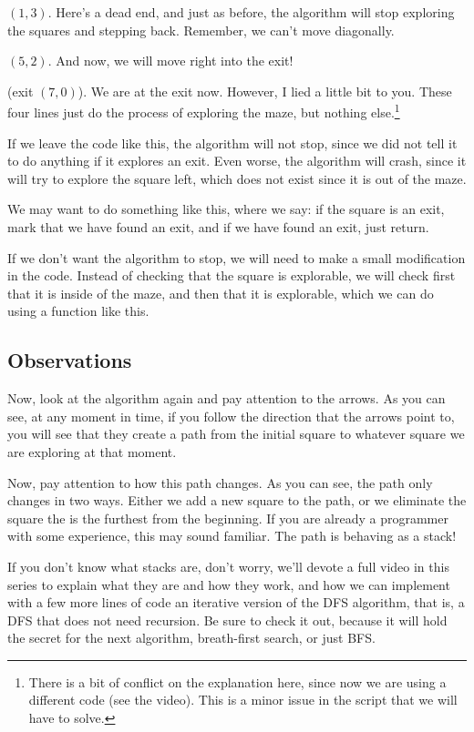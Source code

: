 \documentclass[12pt]{article}
\begin{document}
$(1, 3)$. Here's a dead end, and just as before, the algorithm
will stop exploring the squares and stepping back.
Remember, we can't move diagonally.

$(5, 2)$. And now, we will move right into the exit!

(exit $(7, 0)$). We are at the exit now. However, I lied a
little bit to you. These four lines just do the process of
exploring the maze, but nothing else.\footnote{There is a bit of conflict on the
explanation here, since now we are using a different code (see the video).
This is a minor issue in the script that we will have to solve.}

If we leave the code like this, the algorithm will not stop,
since we did not tell it to do anything if it explores an
exit. Even worse, the algorithm will crash, since it will
try to explore the square left, which does not 
exist since it is out of the maze.

We may want to do something like this,
where we say: if the square is an exit, mark that we have found
an exit, and if we have found an exit, just return.

If we don't want the algorithm to stop, we will need
to make a small modification in the code. Instead of
checking that the square is explorable,
we will check first that it is inside of the maze,
and then that it is explorable, which we can do using
a function like this.


\subsection{Observations}

Now, look at the algorithm again and pay attention to the arrows. As you can
see, at any moment in time, if you follow the direction that the arrows point to,
you will see that they create a path from the initial square to whatever square
we are exploring at that moment.

Now, pay attention to how this path changes. As you can see, the path only changes
in two ways. Either we add a new square to the path, or we eliminate the square
the is the furthest from the beginning. If you are already a programmer with some
experience, this may sound familiar. The path is behaving as a stack!

If you don't know what stacks are, don't worry, we'll devote a full video in
this series to explain what they are and how they work, and how we can implement 
with a few more lines of code an iterative version of the DFS algorithm,
that is, a DFS that does not
need recursion. Be sure to check it out, because it will hold the secret
for the next algorithm, breath-first search, or just BFS.
\end{document}
